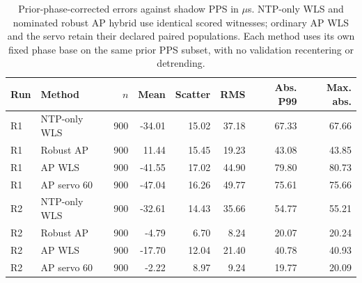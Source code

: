 
\begin{table}[t]\centering\small
\caption{Prior-phase-corrected errors against shadow PPS in $\mu$s. NTP-only WLS and nominated robust AP hybrid use identical scored witnesses; ordinary AP WLS and the servo retain their declared paired populations. Each method uses its own fixed phase base on the same prior PPS subset, with no validation recentering or detrending.}
\label{tab:hybrid-accuracy}\begin{tabular}{llrrrrrr}\toprule
Run & Method & $n$ & Mean & Scatter & RMS & Abs. P99 & Max. abs. \\ \midrule
R1 & NTP-only WLS & 900 & -34.01 & 15.02 & 37.18 & 67.33 & 67.66 \\
R1 & Robust AP & 900 & 11.44 & 15.45 & 19.23 & 43.08 & 43.85 \\
R1 & AP WLS & 900 & -41.55 & 17.02 & 44.90 & 79.80 & 80.73 \\
R1 & AP servo 60 & 900 & -47.04 & 16.26 & 49.77 & 75.61 & 75.66 \\
R2 & NTP-only WLS & 900 & -32.61 & 14.43 & 35.66 & 54.77 & 55.21 \\
R2 & Robust AP & 900 & -4.79 & 6.70 & 8.24 & 20.07 & 20.24 \\
R2 & AP WLS & 900 & -17.70 & 12.04 & 21.40 & 40.78 & 40.93 \\
R2 & AP servo 60 & 900 & -2.22 & 8.97 & 9.24 & 19.77 & 20.09 \\
\bottomrule\end{tabular}

\end{table}
